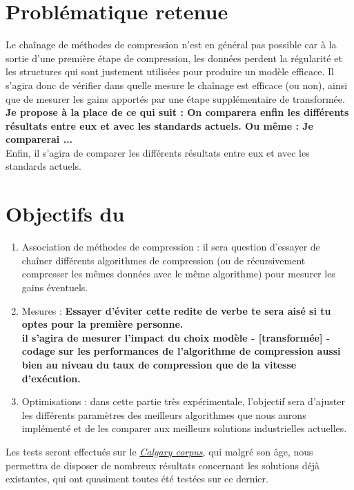 \documentclass[a4paper, 11pt]{article}
\begin{document}
\section*{Problématique retenue}

Le chaînage de méthodes de compression n'est en général pas possible car à la sortie d'une première étape de compression, les données perdent la régularité et les structures qui sont justement utilisées pour produire un modèle efficace. Il s'agira donc de vérifier dans quelle mesure le chaînage est efficace (ou non), ainsi que de mesurer les gains apportés par une étape supplémentaire de transformée. 
\\
{\bf{\red Je propose \`a la place de ce qui suit : On comparera enfin les différents résultats entre eux et avec les standards actuels. Ou m\^eme : Je comparerai ...}}\\Enfin, il s'agira de comparer les différents résultats entre eux et avec les standards actuels.

\section*{Objectifs du }

\begin{enumerate}
  \item Association de méthodes de compression : il sera question d'essayer de chaîner différents algorithmes de compression (ou de récursivement compresser les mêmes données avec le même algorithme) pour mesurer les gains éventuels.
  \item Mesures : \bf{\red Essayer d'\'eviter cette redite de verbe te sera ais\'e si tu optes pour la premi\`ere personne.}\\il s'agira de mesurer l'impact du choix modèle - [transformée] - codage sur les performances de l'algorithme de compression aussi bien au niveau du taux de compression que de la vitesse d'exécution.
  \item Optimisations : dans cette partie très expérimentale, l'objectif sera d'ajuster les différents paramètres des meilleurs algorithmes que nous aurons implémenté et de les comparer aux meilleurs solutions industrielles actuelles.
\end{enumerate}

Les tests seront effectués sur le \href{https://en.wikipedia.org/wiki/Calgary_corpus}{\itshape{Calgary corpus}}, qui malgré son âge, nous permettra de disposer de nombreux résultats concernant les solutions déjà existantes, qui ont quasiment toutes été testées sur ce dernier.
\end{document}
